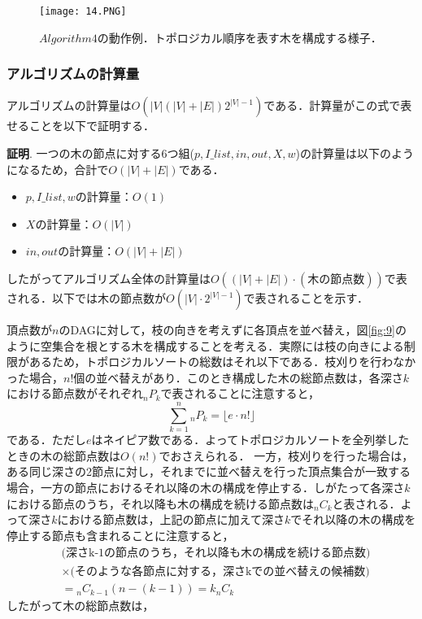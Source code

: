 \documentclass{kuisthesis}           %
\begin{document}
 \begin{figure}[H]
    \centering
    \texttt{[image: 14.PNG]}
    \caption{$Algorithm4$の動作例．トポロジカル順序を表す木を構成する様子．}
    \label{fig:8}
 \end{figure}



 \subsubsection{アルゴリズムの計算量}

 アルゴリズムの計算量は$O(|V|(|V|+|E|)2^{|V|-1})$である．計算量がこの式で表せることを以下で証明する．

 \textbf{証明}.
 一つの木の節点に対する6つ組($p, I\_list, in, out, X, w$)の計算量は以下のようになるため，合計で$O(|V|+|E|)$である．

 \begin{itemize}
     \item $p, I\_list, w$の計算量：$O(1)$
     \item $X$の計算量：$O(|V|)$
     \item $in, out$の計算量：$O(|V|+|E|)$
 \end{itemize}
 
 したがってアルゴリズム全体の計算量は$O((|V|+|E|)\cdot(\mbox{木の節点数}))$で表される．以下では木の節点数が$O(|V|\cdot 2^{|V|-1})$で表されることを示す．

 頂点数が$n$のDAGに対して，枝の向きを考えずに各頂点を並べ替え，図\ref{fig:9}のように空集合を根とする木を構成することを考える．実際には枝の向きによる制限があるため，トポロジカルソートの総数はそれ以下である．枝刈りを行わなかった場合，$n!$個の並べ替えがあり．このとき構成した木の総節点数は，各深さ$k$における節点数がそれぞれ${}_{n}P_{k}$で表されることに注意すると，
 \[\sum_{k=1}^{n}{}_{n}P_{k}=\lfloor e\cdot n!\rfloor\]
 である．ただし$e$はネイピア数である．よってトポロジカルソートを全列挙したときの木の総節点数は$O(n!)$でおさえられる．
 一方，枝刈りを行った場合は，ある同じ深さの2節点に対し，それまでに並べ替えを行った頂点集合が一致する場合，一方の節点におけるそれ以降の木の構成を停止する．しがたって各深さ$k$における節点のうち，それ以降も木の構成を続ける節点数は${}_{n}C_{k}$と表される．よって深さ$k$における節点数は，上記の節点に加えて深さ$k$でそれ以降の木の構成を停止する節点も含まれることに注意すると，
 \begin{align*}
    &\mbox{(深さk-1の節点のうち，それ以降も木の構成を続ける節点数)} \\
    &\times\mbox{(そのような各節点に対する，深さkでの並べ替えの候補数)} \\
    &={}_{n}C_{k-1}(n-(k-1)) = k{}_{n}C_{k}
 \end{align*}
 したがって木の総節点数は，
 
\end{document}
